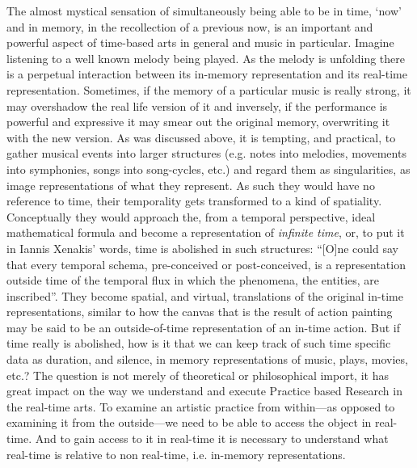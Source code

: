 The almost mystical sensation of simultaneously being able to be in time, `now' and in memory, in the recollection of a previous now, is an important and powerful aspect of time-based arts in general and music in particular. Imagine listening to a well known melody being played. As the melody is unfolding there is a perpetual interaction between its in-memory representation and its real-time representation. Sometimes, if the memory of a particular music is really strong, it may overshadow the real life version of it and inversely, if the performance is powerful and expressive it may smear out the original memory, overwriting it with the new version. As was discussed above, it is tempting, and practical, to gather musical events into larger structures (e.g. notes into melodies, movements into symphonies, songs into song-cycles, etc.) and regard them as singularities, as image representations of what they represent. As such they would have no reference to time, their temporality gets transformed to a kind of spatiality. Conceptually they would approach the, from a temporal perspective, ideal mathematical formula and become a representation of \emph{infinite time}, \parencite{roads} or, to put it in Iannis Xenakis' words, time is abolished in such structures: ``[O]ne could say that every temporal schema, pre-conceived or post-conceived, is a representation outside time of the temporal flux in which the phenomena, the entities, are  inscribed''. \parencite[264]{xenakis71} They become spatial, and virtual, translations of the original in-time representations, similar to how the canvas that is the result of action painting may be said to be an outside-of-time representation of an in-time action. But if time really is abolished, how is it that we can keep track of such time specific data as duration, and silence, in memory representations of music, plays, movies, etc.? The question is not merely of theoretical or philosophical import, it has great impact on the way we understand and execute Practice based Research in the real-time arts. To examine an artistic practice from within---as opposed to examining it from the outside---we need to be able to access the object in real-time. And to gain access to it in real-time it is necessary to understand what real-time is relative to non real-time, i.e. in-memory representations.

